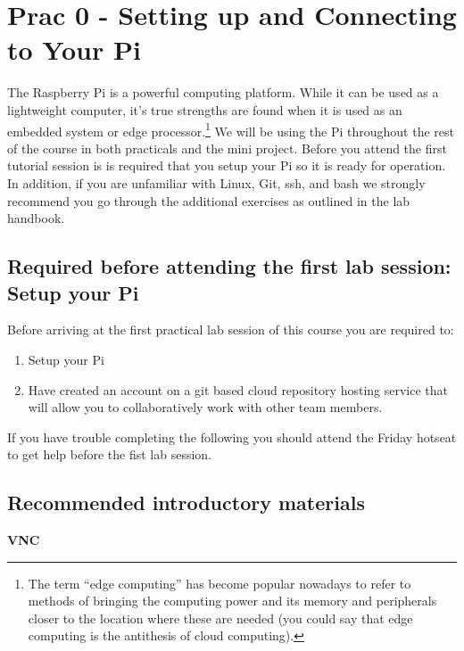 \setcounter{section}{-1}
\section{Prac 0 - Setting up and Connecting to Your Pi}
The Raspberry Pi is a powerful computing platform. While it can be used as a lightweight computer, it's true strengths are found when it is used as an embedded system or edge processor.\footnote{The term “edge computing” has become popular nowadays to refer to methods of bringing the computing power and its memory and peripherals closer to the location where these are needed (you could say that edge computing is the antithesis of cloud computing).}  We will be using the Pi throughout the rest of the course in both practicals and the mini project.  Before you attend the first tutorial session is is required that you setup your Pi so it is ready for operation.  In addition, if you are unfamiliar with Linux, Git, ssh, and bash we strongly recommend you go through the additional exercises as outlined in the lab handbook.

\subsection{Required before attending the first lab session: Setup your Pi }
Before arriving at the first practical lab session of this course you are required to:
\begin{enumerate}
    \item Setup your Pi
    \item Have created an account on a git based cloud repository hosting service that will allow you to collaboratively work with other team members.
\end{enumerate}

If you have trouble completing the following you should attend the Friday hotseat to get help before the fist lab session.



\subsection{Recommended introductory materials}

\textbf{VNC}